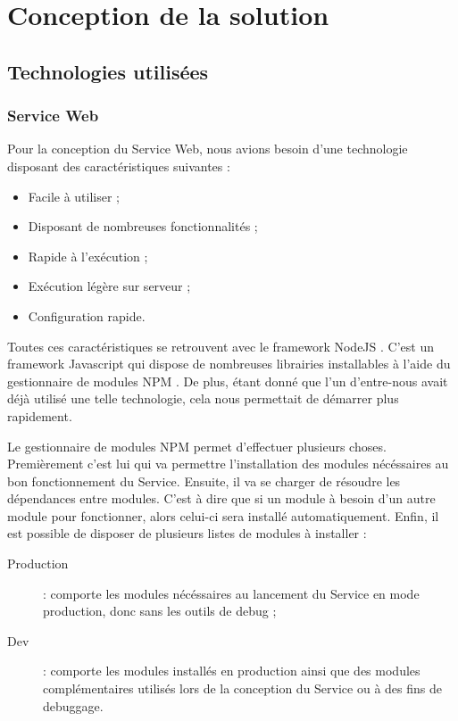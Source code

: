 \section{Conception de la solution}

    \subsection{Technologies utilisées}

        \subsubsection{Service Web}

            Pour la conception du Service Web, nous avions besoin d'une technologie disposant des caractéristiques suivantes :
            \begin{itemize}
                \item Facile à utiliser ;
                \item Disposant de nombreuses fonctionnalités ;
                \item Rapide à l'exécution ;
                \item Exécution légère sur serveur ;
                \item Configuration rapide.
            \end{itemize}

            Toutes ces caractéristiques se retrouvent avec le framework NodeJS \cite{nodejs}. C'est un framework Javascript qui dispose de nombreuses librairies installables à l'aide du gestionnaire de modules NPM \cite{npmjs}. De plus, étant donné que l'un d'entre-nous avait déjà utilisé une telle technologie, cela nous permettait de démarrer plus rapidement.

            Le gestionnaire de modules NPM permet d'effectuer plusieurs choses.
            Premièrement c'est lui qui va permettre l'installation des modules nécéssaires au bon fonctionnement du Service. Ensuite, il va se charger de résoudre les dépendances entre modules. C'est à dire que si un module à besoin d'un autre module pour fonctionner, alors celui-ci sera installé automatiquement.
            Enfin, il est possible de disposer de plusieurs listes de modules à installer :
            \begin{description}
                \item [Production] : comporte les modules nécéssaires au lancement du Service en mode production, donc sans les outils de debug ;
                \item [Dev] : comporte les modules installés en production ainsi que des modules complémentaires utilisés lors de la conception du Service ou à des fins de debuggage.
            \end{description}

